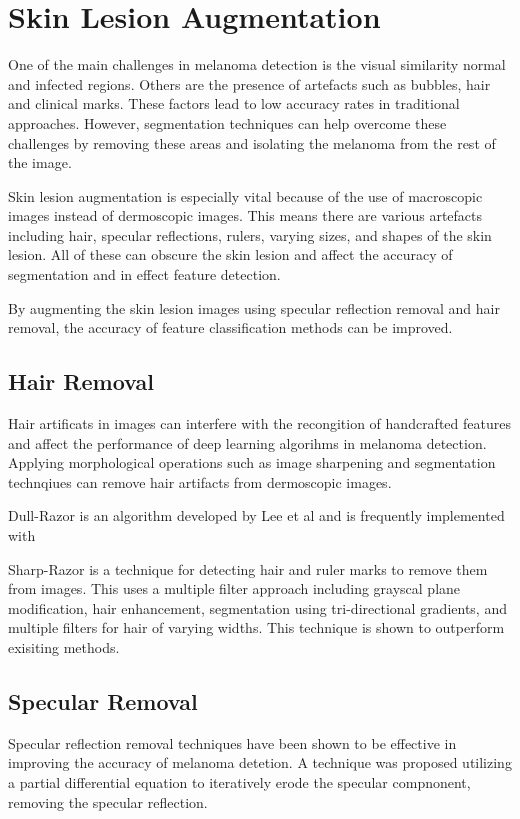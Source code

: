 



\section{Skin Lesion Augmentation}
One of the main challenges in melanoma detection is the visual similarity normal and infected regions. Others are the presence of artefacts such as bubbles, hair and clinical marks\cite{Albahli2020}. These factors lead to low accuracy rates in traditional approaches. However, segmentation techniques can help overcome these challenges by removing these areas and isolating the melanoma from the rest of the image.

Skin lesion augmentation is especially vital because of the use of macroscopic images instead of dermoscopic images. This means there are various artefacts including hair, specular reflections, rulers, varying sizes, and shapes of the skin lesion. All of these can obscure the skin lesion and affect the accuracy of segmentation\cite{Unver2019} and in effect feature detection.

By augmenting the skin lesion images using specular reflection removal and hair removal, the accuracy of feature classification methods can be improved\cite{kasmi2023}. 

\subsection{Hair Removal}
Hair artificats in images can interfere with the recongition of handcrafted features and affect the performance of deep learning algorihms in melanoma detection\cite{kasmi2023}. Applying morphological operations such as image sharpening and segmentation technqiues can remove hair artifacts from dermoscopic images\cite{kasmi2023}.

Dull-Razor is an algorithm developed by Lee et al\cite{Lee1997} and is frequently implemented with 

Sharp-Razor\cite{kasmi2023} is a technique for detecting hair and ruler marks to remove them from  images. This uses a multiple filter approach including grayscal plane modification, hair enhancement, segmentation using tri-directional gradients, and multiple filters for hair of varying widths. This technique is shown to outperform exisiting methods.

\subsection{Specular Removal}
Specular reflection removal techniques have been shown to be effective in improving the accuracy of melanoma detetion\cite{Shen2009}. A technique was proposed utilizing a partial differential equation to iteratively erode the specular compnonent, removing the specular reflection\cite{Shen2009}.


